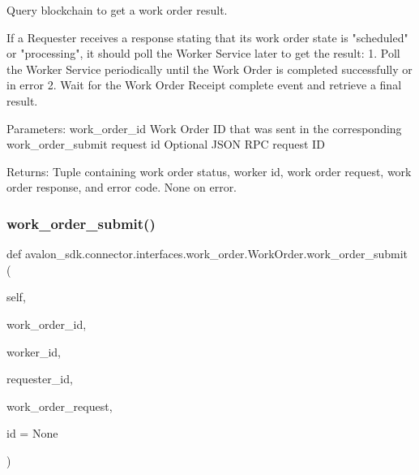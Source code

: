 \begin{DoxyVerb}Query blockchain to get a work order result.

If a Requester receives a response stating that its work order state
is "scheduled" or "processing", it should poll the Worker Service
later to get the result:
1. Poll the Worker Service periodically until the Work Order is
completed successfully or in error
2. Wait for the Work Order Receipt complete event and retrieve a final
result.

Parameters:
work_order_id Work Order ID that was sent in the
      corresponding work_order_submit request
id            Optional JSON RPC request ID

Returns:
Tuple containing work order status, worker id, work order request,
work order response, and error code.
None on error.
\end{DoxyVerb}
 \mbox{\label{classavalon__sdk_1_1connector_1_1interfaces_1_1work__order_1_1WorkOrder_aea6e59d06a08e5ab0c3fdea6650fd453}} 
\subsubsection{\texorpdfstring{work\+\_\+order\+\_\+submit()}{work\_order\_submit()}}
{\footnotesize\ttfamily def avalon\+\_\+sdk.\+connector.\+interfaces.\+work\+\_\+order.\+Work\+Order.\+work\+\_\+order\+\_\+submit (\begin{DoxyParamCaption}\item[{}]{self,  }\item[{}]{work\+\_\+order\+\_\+id,  }\item[{}]{worker\+\_\+id,  }\item[{}]{requester\+\_\+id,  }\item[{}]{work\+\_\+order\+\_\+request,  }\item[{}]{id = {\ttfamily None} }\end{DoxyParamCaption})}

